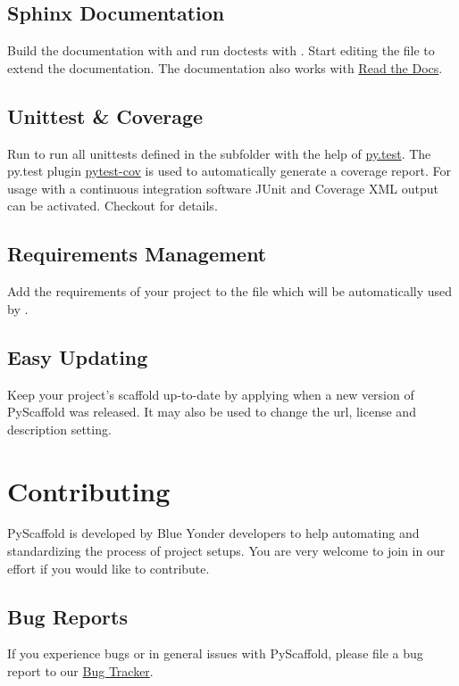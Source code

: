 \documentclass[letterpaper,10pt,english]{sphinxmanual}
\begin{document}
\subsection{Sphinx Documentation}
\label{features:sphinx-documentation}
Build the documentation with  and run doctests with
. Start editing the file  to
extend the documentation. The documentation also works with \href{https://readthedocs.org/}{Read the Docs}.


\subsection{Unittest \& Coverage}
\label{features:unittest-coverage}
Run  to run all unittests defined in the subfolder
 with the help of \href{http://pytest.org/}{py.test}. The py.test plugin
\href{https://github.com/schlamar/pytest-cov}{pytest-cov} is used to automatically
generate a coverage report. For usage with a continuous integration software
JUnit and Coverage XML output can be activated. Checkout  for
details.


\subsection{Requirements Management}
\label{features:requirements-management}
Add the requirements of your project to the  file which
will be automatically used by .


\subsection{Easy Updating}
\label{features:easy-updating}
Keep your project's scaffold up-to-date by applying
 when a new version of PyScaffold was released.
It may also be used to change the url, license and description setting.


\section{Contributing}
\label{contrib:contributing}\label{contrib::doc}
PyScaffold is developed by Blue Yonder developers to help automating and
standardizing the process of project setups.
You are very welcome to join in our effort if you would like to contribute.


\subsection{Bug Reports}
\label{contrib:bug-reports}
If you experience bugs or in general issues with PyScaffold, please file a bug
report to our \href{http://github.com/blue-yonder/pyscaffold/issues}{Bug Tracker}.
\end{document}
